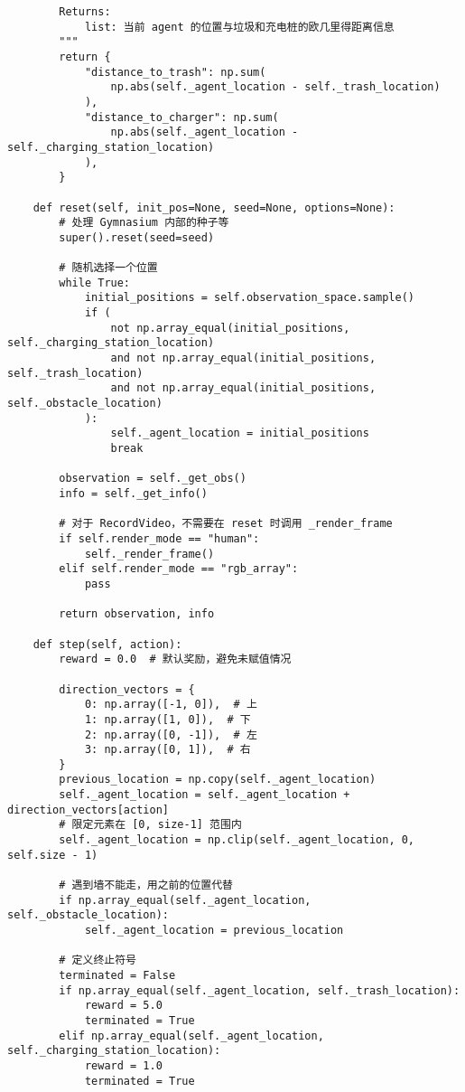 \begin{verbatim}
        Returns:
            list: 当前 agent 的位置与垃圾和充电桩的欧几里得距离信息
        """
        return {
            "distance_to_trash": np.sum(
                np.abs(self._agent_location - self._trash_location)
            ),
            "distance_to_charger": np.sum(
                np.abs(self._agent_location - self._charging_station_location)
            ),
        }

    def reset(self, init_pos=None, seed=None, options=None):
        # 处理 Gymnasium 内部的种子等
        super().reset(seed=seed)

        # 随机选择一个位置
        while True:
            initial_positions = self.observation_space.sample()
            if (
                not np.array_equal(initial_positions, self._charging_station_location)
                and not np.array_equal(initial_positions, self._trash_location)
                and not np.array_equal(initial_positions, self._obstacle_location)
            ):
                self._agent_location = initial_positions
                break

        observation = self._get_obs()
        info = self._get_info()

        # 对于 RecordVideo，不需要在 reset 时调用 _render_frame
        if self.render_mode == "human":
            self._render_frame()
        elif self.render_mode == "rgb_array":
            pass

        return observation, info

    def step(self, action):
        reward = 0.0  # 默认奖励，避免未赋值情况

        direction_vectors = {
            0: np.array([-1, 0]),  # 上
            1: np.array([1, 0]),  # 下
            2: np.array([0, -1]),  # 左
            3: np.array([0, 1]),  # 右
        }
        previous_location = np.copy(self._agent_location)
        self._agent_location = self._agent_location + direction_vectors[action]
        # 限定元素在 [0, size-1] 范围内
        self._agent_location = np.clip(self._agent_location, 0, self.size - 1)

        # 遇到墙不能走，用之前的位置代替
        if np.array_equal(self._agent_location, self._obstacle_location):
            self._agent_location = previous_location

        # 定义终止符号
        terminated = False
        if np.array_equal(self._agent_location, self._trash_location):
            reward = 5.0
            terminated = True
        elif np.array_equal(self._agent_location, self._charging_station_location):
            reward = 1.0
            terminated = True


\end{verbatim}
